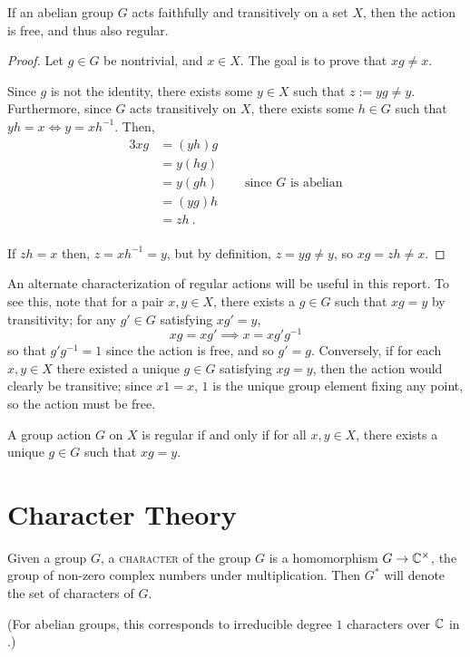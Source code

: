 \documentclass{report}
\begin{document}
    \begin{lem}\label{faithful-transitive-abelian}
      If an abelian group $G$ acts faithfully and transitively on a set $X$,
      then the action is free, and thus also regular. \cite[Section 4.1,
      Exercise 3]{dummit-foote}
    \end{lem}

    \begin{proof}
      Let $g \in G$ be nontrivial, and $x \in X$.
      The goal is to prove that $xg \neq x$.

      Since $g$ is not the identity,
      there exists some $y \in X$ such that $z := yg \neq y$.
      Furthermore, since $G$ acts transitively on $X$,
      there exists some $h \in G$ such that $yh = x \iff y = xh^{-1}$.
      Then,
      \begin{alignat*}{3}
        xg &= (yh) g &\\
        &= y (hg) &\\
        &= y (gh) \quad&\text{ since $G$ is abelian}\\
        &= (yg) h &\\
        &= zh \ .&\\
      \end{alignat*}

      If $zh = x$ then, $z = xh^{-1} = y$,
      but by definition, $z = yg \neq y$,
      so $xg = zh \neq x$.
    \end{proof}

    An alternate characterization of regular actions will be useful in this
    report.  To see this, note that for a pair $x, y \in X$, there exists a $g
    \in G$ such that $xg = y$ by transitivity; for any $g' \in G$ satisfying
    $xg' = y$,
    $$
      xg = xg' \implies x = x g'g^{-1}
    $$
    so that $g'g^{-1} = 1$ since the action is free, and so $g' = g$.
    Conversely, if for each $x, y \in X$ there existed a unique $g \in G$
    satisfying $xg = y$, then the action would clearly be transitive; since $x 1
    = x$, $1$ is the unique group element fixing any point, so the action must
    be free.

    \begin{lem}\label{regular-unique}
      A group action $G$ on $X$ is regular if and only if
      for all $x, y \in X$, there exists a unique $g \in G$
      such that $xg = y$.
    \end{lem}

  \section{Character Theory}
    \begin{defn}[Characters]\label{character}
      Given a group $G$, a \textsc{character} of the group $G$
      is a homomorphism $G \to \mathbb{C}^\times$,
      the group of non-zero complex numbers under multiplication.
      Then $G^*$ will denote the set of characters of $G$.
      \cite[Chapter 8]{godsil}

      (For abelian groups, this corresponds to irreducible degree $1$ characters
      over $\mathbb{C}$ in \cite[Section 18.3]{dummit-foote}.)
    \end{defn}
\end{document}
